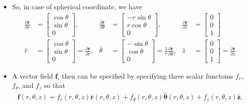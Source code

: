 \documentclass[10pt]{article}
\newcommand{\ve}[1]{\mathbf{#1}}
\begin{document}
\begin{itemize}
    \item So, in case of spherical coordinate, we have
    \begin{align*}
      \frac{\partial \ve{r}}{\partial r} &= \begin{bmatrix}
        \cos \theta \\ \sin\theta \\ 0
      \end{bmatrix},
      &\frac{\partial \ve{r}}{\partial \theta} &= \begin{bmatrix}
        -r \sin \theta \\ r\cos\theta \\ 0
      \end{bmatrix},
      &\frac{\partial \ve{r}}{\partial z} &= \begin{bmatrix}
        0 \\ 0 \\ 1
      \end{bmatrix}\\
      \hat{r} &= \begin{bmatrix}
        \cos \theta \\ \sin\theta \\ 0
      \end{bmatrix}
      = \frac{\partial \ve{r}}{\partial r},
      &\hat{\theta} &= \begin{bmatrix}
        - \sin \theta \\ \cos\theta \\ 0
      \end{bmatrix}
      = \frac{1}{r} \frac{\partial \ve{r}}{\partial \theta},
      &\hat{z} &= \begin{bmatrix}
        0 \\ 0 \\ 1
      \end{bmatrix}
      = \frac{\partial \ve{r}}{\partial z}
    \end{align*}

    \item A vector field $\ve{f}$, then can be specified by specifying three scalar functoins $f_r$, $f_\theta$, and $f_z$ so that
    \begin{align*}
      \ve{f}(r, \theta, z) = f_r(r, \theta, z) \hat{\ve{r}}(r, \theta, z) +
        f_\theta(r, \theta, z) \hat{\ve{\theta}}(r, \theta, z) +
        f_z(r, \theta, z) \hat{\ve{z}}.
    \end{align*}


\end{itemize}
\end{document}
